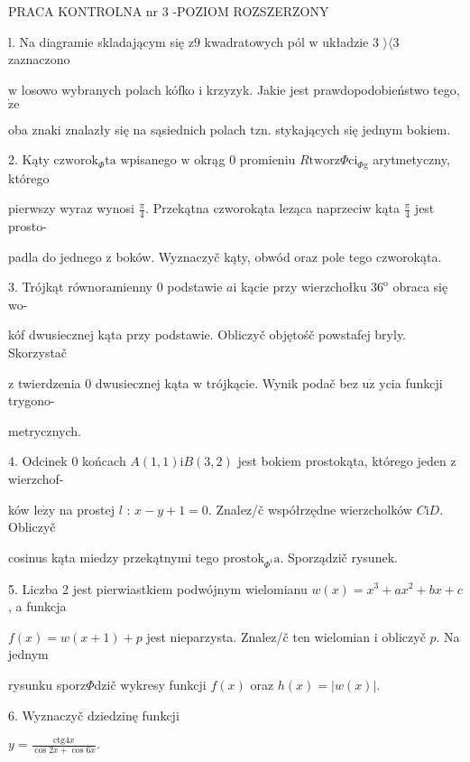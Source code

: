 \documentclass[a4paper,12pt]{article}
\begin{document}
PRACA KONTROLNA nr 3 -POZIOM ROZSZERZONY

l. Na diagramie skladającym się $\mathrm{z} 9$ kwadratowych pól $\mathrm{w}$ układzie 3 $\rangle\langle 3$ zaznaczono

$\mathrm{w}$ losowo wybranych polach kófko $\mathrm{i}$ krzyzyk. Jakie jest prawdopodobieństwo tego, $\dot{\mathrm{z}}\mathrm{e}$

oba znaki znalazły się na sąsiednich polach $\mathrm{t}\mathrm{z}\mathrm{n}$. stykających się jednym bokiem.

2. Kąty $\mathrm{c}\mathrm{z}\mathrm{w}\mathrm{o}\mathrm{r}\mathrm{o}\mathrm{k}_{\Phi}\mathrm{t}\mathrm{a}$ wpisanego $\mathrm{w}$ okrąg $0$ promieniu $R\mathrm{t}\mathrm{w}\mathrm{o}\mathrm{r}\mathrm{z}\Phi \mathrm{c}\mathrm{i}_{\Phi \mathrm{g}}$ arytmetyczny, którego

pierwszy wyraz wynosi $\displaystyle \frac{\pi}{4}$. Przekątna czworokąta leząca naprzeciw kąta $\displaystyle \frac{\pi}{4}$ jest prosto-

padla do jednego $\mathrm{z}$ boków. Wyznaczyč kąty, obwód oraz pole tego czworokąta.

3. Trójkąt równoramienny $0$ podstawie $a \mathrm{i}$ kącie przy wierzchołku $36^{\mathrm{o}}$ obraca się wo-

kóf dwusiecznej kąta przy podstawie. Obliczyč objętośč powstafej bryly. Skorzystač

$\mathrm{z}$ twierdzenia $0$ dwusiecznej kąta $\mathrm{w}$ trójkącie. Wynik podač bez $\mathrm{u}\dot{\mathrm{z}}$ ycia funkcji trygono-

metrycznych.

4. Odcinek $0$ końcach $A(1,1)\mathrm{i}B(3,2)$ jest bokiem prostokąta, którego jeden $\mathrm{z}$ wierzchof-

ków $\mathrm{l}\mathrm{e}\dot{\mathrm{z}}\mathrm{y}$ na prostej $l$ : $x-y+1=0$. Znalez/č współrzędne wierzcholków $C\mathrm{i}D$. Obliczyč

cosinus kąta miedzy przekątnymi tego $\mathrm{p}\mathrm{r}\mathrm{o}\mathrm{s}\mathrm{t}\mathrm{o}\mathrm{k}_{\Phi^{\mathrm{t}}}\mathrm{a}$. Sporządzič rysunek.

5. Liczba 2 jest pierwiastkiem podwójnym wielomianu $w(x)=x^{3}+ax^{2}+bx+c$, a funkcja

$f(x) =w(x+1)+p$ jest nieparzysta. Znalez/č ten wielomian $\mathrm{i}$ obliczyč $p$. Na jednym

rysunku sporz$\Phi$dzič wykresy funkcji $f(x)$ oraz $h(x)=|w(x)|.$

6. Wyznaczyč dziedzinę funkcji

$y=\displaystyle \frac{\mathrm{c}\mathrm{t}\mathrm{g}4x}{\cos 2x+\cos 6x}.$
\end{document}

